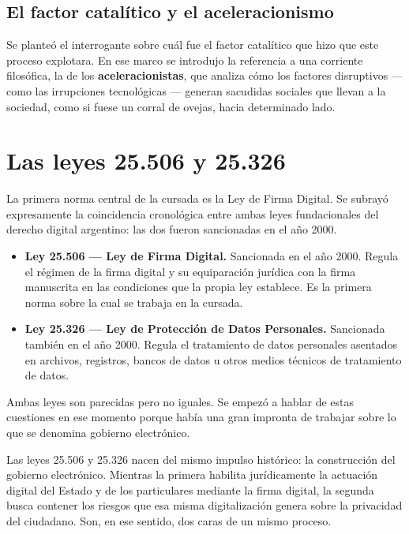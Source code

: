 \documentclass[12pt,oneside]{book}
\begin{document}
\subsection{El factor catalítico y el aceleracionismo}

Se planteó el interrogante sobre cuál fue el factor catalítico que hizo que este proceso explotara. En ese marco se introdujo la referencia a una corriente filosófica, la de los \textbf{aceleracionistas}, que analiza cómo los factores disruptivos --- como las irrupciones tecnológicas --- generan sacudidas sociales que llevan a la sociedad, como si fuese un corral de ovejas, hacia determinado lado.


\section{Las leyes 25.506 y 25.326}

La primera norma central de la cursada es la Ley de Firma Digital. Se subrayó expresamente la coincidencia cronológica entre ambas leyes fundacionales del derecho digital argentino: las dos fueron sancionadas en el año 2000.

\begin{itemize}
    \item \textbf{Ley 25.506 --- Ley de Firma Digital.} Sancionada en el año 2000. Regula el régimen de la firma digital y su equiparación jurídica con la firma manuscrita en las condiciones que la propia ley establece. Es la primera norma sobre la cual se trabaja en la cursada.
    \item \textbf{Ley 25.326 --- Ley de Protección de Datos Personales.} Sancionada también en el año 2000. Regula el tratamiento de datos personales asentados en archivos, registros, bancos de datos u otros medios técnicos de tratamiento de datos.
\end{itemize}

Ambas leyes son parecidas pero no iguales. Se empezó a hablar de estas cuestiones en ese momento porque había una gran impronta de trabajar sobre lo que se denomina gobierno electrónico.

\begin{important}
Las leyes 25.506 y 25.326 nacen del mismo impulso histórico: la construcción del gobierno electrónico. Mientras la primera habilita jurídicamente la actuación digital del Estado y de los particulares mediante la firma digital, la segunda busca contener los riesgos que esa misma digitalización genera sobre la privacidad del ciudadano. Son, en ese sentido, dos caras de un mismo proceso.
\end{important}
\end{document}
